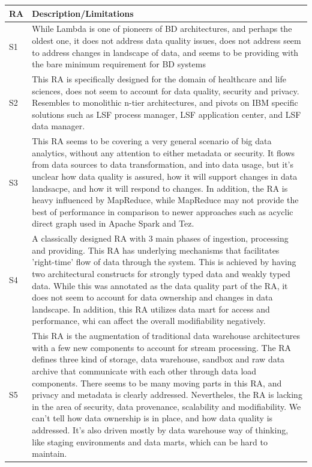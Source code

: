 \documentclass[review]{elsarticle}
\begin{document}
\begin{longtable}{|p{0.5cm}|p{11cm}|}
        \hline
        RA & Description/Limitations \\ 
        \hline
        S1 & While Lambda is one of pioneers of BD architectures, and perhaps the oldest one, it does not address data quality issues, does not address seem to address changes in landscape of data, and seems to be providing with the bare minimum requirement for BD systems  \\
        \hline
        S2 & This RA is specifically designed for the domain of healthcare and life sciences, does not seem to account for data quality, security and privacy. Resembles to monolithic n-tier architectures, and pivots on IBM specific solutions such as LSF process manager, LSF application center, and LSF data manager. \\
        \hline
        S3 & This RA seems to be covering a very general scenario of big data analytics, without any attention to either metadata or security. It flows from data sources to data transformation, and into data usage, but it's unclear how data quality is assured, how it will support changes in data landsacpe, and how it will respond to changes. In addition, the RA is heavy influenced by MapReduce, while MapReduce may not provide the best of performance in comparison to newer approaches such as acyclic direct graph used in Apache Spark and Tez.  \\
        \hline
        S4 & A classically designed RA with 3 main phases of ingestion, processing and providing. This RA has underlying mechanisms that facilitates 'right-time' flow of data through the system. This is achieved by having two architectural constructs for strongly typed data and weakly typed data. While this was annotated as the data quality part of the RA, it does not seem to account for data ownership and changes in data landscape. In addition, this RA utilizes data mart for access and performance, whi can affect the overall modifiability negatively.   \\
        \hline
        S5 & This RA is the augmentation of traditional data warehouse architectures with a few new components to account for stream processing. The RA defines three kind of storage, data warehouse, sandbox and raw data archive that communicate with each other through data load components. There seems to be many moving parts in this RA, and privacy and metadata is clearly addressed. Nevertheles, the RA is lacking in the area of security, data provenance, scalability and modifiability. We can't tell how data ownership is in place, and how data quality is addressed. It's also driven mostly by data warehouse way of thinking, like staging environments and data marts, which can be hard to maintain.  \\

\end{longtable}
\end{document}
